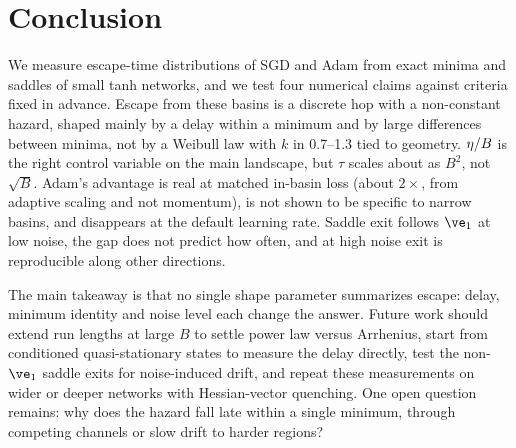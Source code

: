 \section{Conclusion}
\label{sec:conclusion}

We measure escape-time distributions of SGD and Adam from exact minima and saddles of small tanh networks, and we test four numerical claims against criteria fixed in advance.
Escape from these basins is a discrete hop with a non-constant hazard, shaped mainly by a delay within a minimum and by large differences between minima, not by a Weibull law with $k$ in 0.7--1.3 tied to geometry.
$\eta/B$ is the right control variable on the main landscape, but $\tau$ scales about as $B^{2}$, not $\sqrt{B}$.
Adam's advantage is real at matched in-basin loss (about $2\times$, from adaptive scaling and not momentum), is not shown to be specific to narrow basins, and disappears at the default learning rate.
Saddle exit follows $\etop$ at low noise, the gap does not predict how often, and at high noise exit is reproducible along other directions.

The main takeaway is that no single shape parameter summarizes escape: delay, minimum identity and noise level each change the answer.
Future work should extend run lengths at large $B$ to settle power law versus Arrhenius, start from conditioned quasi-stationary states to measure the delay directly, test the non-$\etop$ saddle exits for noise-induced drift, and repeat these measurements on wider or deeper networks with Hessian-vector quenching.
One open question remains: why does the hazard fall late within a single minimum, through competing channels or slow drift to harder regions?
